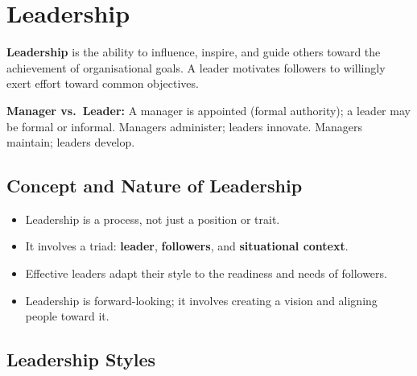 \documentclass[12pt,a4paper]{article}
\begin{document}
\section{Leadership}

\begin{tcolorbox}[defbox, title={\textbf{Leadership --- Definition}}]
\textbf{Leadership} is the ability to influence, inspire, and guide others toward the achievement of organisational goals. A leader motivates followers to willingly exert effort toward common objectives.
\par\vspace{3pt}
\textbf{Manager vs.\ Leader:} A manager is appointed (formal authority); a leader may be formal or informal. Managers administer; leaders innovate. Managers maintain; leaders develop.
\end{tcolorbox}

\subsection{Concept and Nature of Leadership}
\begin{itemize}[leftmargin=*, itemsep=3pt]
  \item Leadership is a process, not just a position or trait.
  \item It involves a triad: \textbf{leader}, \textbf{followers}, and \textbf{situational context}.
  \item Effective leaders adapt their style to the readiness and needs of followers.
  \item Leadership is forward-looking; it involves creating a vision and aligning people toward it.
\end{itemize}

\subsection{Leadership Styles}
\end{document}
